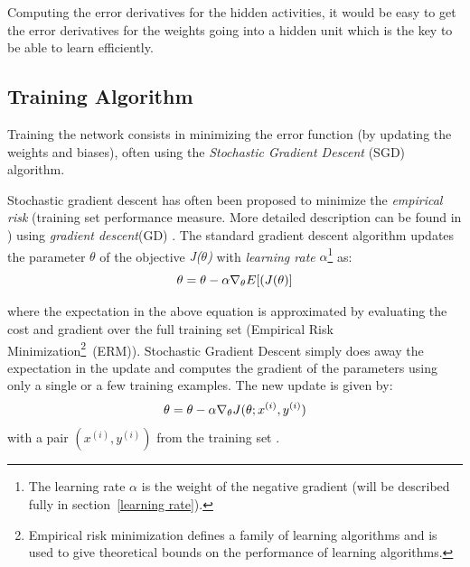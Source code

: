 \indent Computing the error derivatives for the hidden activities, it would be easy to get the error derivatives for the weights going into a hidden unit which is the key to be able to learn efficiently. 
%
%
\subsection{Training Algorithm}
\label{subsec:sgd}
Training the network consists in minimizing the error function (by updating the weights and biases), often using the \textit{Stochastic Gradient Descent} (SGD) algorithm. 

Stochastic gradient descent has often been proposed to minimize the \textit{empirical risk} (training set performance measure. More detailed description can be found in \cite{vapnik1998statistical}) using \textit{gradient descent}(GD) \cite{bottou2010large}. The standard gradient descent algorithm updates the parameter $\theta$ of the objective \textit{J($\theta$)} with \textit{learning rate} $\alpha$\footnote{The learning rate $\alpha$ is the weight of the negative gradient (will be described fully in section~\ref{learning rate}).} as:
\begin{equation}
\centering \theta = \theta - \alpha \nabla_\theta E[(J(\theta)]
\end{equation}

where the expectation in the above equation is approximated by evaluating the cost and gradient over the full training set (Empirical Risk Minimization\footnote{Empirical risk minimization defines a family of learning algorithms and is used to give theoretical bounds on the performance of learning algorithms.}~(ERM)). Stochastic Gradient Descent simply does away the expectation in the update and computes the gradient of the parameters using only a single or a few training examples. The new update is given by:
\begin{equation}
\centering \theta = \theta - \alpha \nabla_\theta J(\theta; x^{(i)}, y^{(i)})
\end{equation}
with a pair $(x^{(i)}, y^{(i)})$ from the training set \cite{sgd}. 


